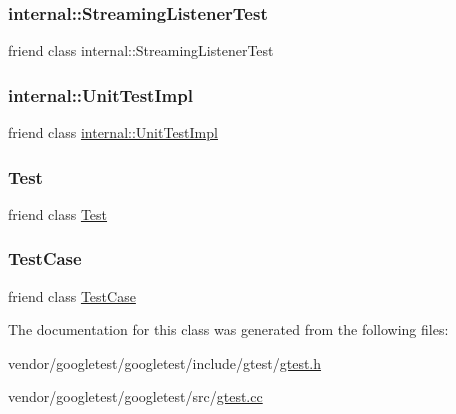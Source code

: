 \subsubsection{\texorpdfstring{internal\+::\+Streaming\+Listener\+Test}{internal::StreamingListenerTest}}
{\footnotesize\ttfamily friend class internal\+::\+Streaming\+Listener\+Test\hspace{0.3cm}{\ttfamily [friend]}}

\mbox{\label{classtesting_1_1_test_info_acc0a5e7573fd6ae7ad1878613bb86853}} 
\subsubsection{\texorpdfstring{internal\+::\+Unit\+Test\+Impl}{internal::UnitTestImpl}}
{\footnotesize\ttfamily friend class \hyperlink{classtesting_1_1internal_1_1_unit_test_impl}{internal\+::\+Unit\+Test\+Impl}\hspace{0.3cm}{\ttfamily [friend]}}

\mbox{\label{classtesting_1_1_test_info_a5b78b1c2e1fa07ffed92da365593eaa4}} 
\subsubsection{\texorpdfstring{Test}{Test}}
{\footnotesize\ttfamily friend class \hyperlink{classtesting_1_1_test}{Test}\hspace{0.3cm}{\ttfamily [friend]}}

\mbox{\label{classtesting_1_1_test_info_aff779e55b06adfa7c0088bd10253f0f0}} 
\subsubsection{\texorpdfstring{Test\+Case}{TestCase}}
{\footnotesize\ttfamily friend class \hyperlink{classtesting_1_1_test_case}{Test\+Case}\hspace{0.3cm}{\ttfamily [friend]}}



The documentation for this class was generated from the following files\+:\begin{DoxyCompactItemize}
\item 
vendor/googletest/googletest/include/gtest/\hyperlink{gtest_8h}{gtest.\+h}\item 
vendor/googletest/googletest/src/\hyperlink{gtest_8cc}{gtest.\+cc}\end{DoxyCompactItemize}
